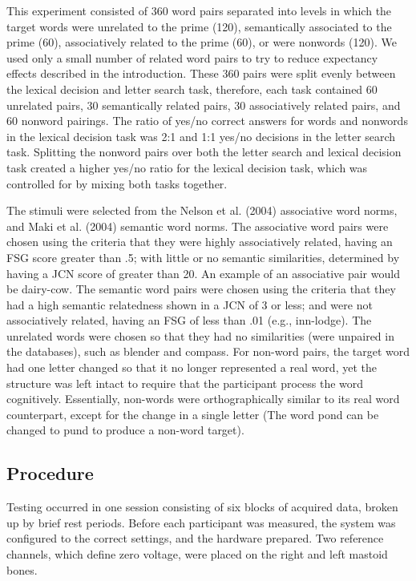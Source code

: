 \documentclass[english,man]{apa6}
\theoremstyle{definition}
\theoremstyle{definition}
\theoremstyle{remark}
\begin{document}
This experiment consisted of 360 word pairs separated into levels in
which the target words were unrelated to the prime (120), semantically
associated to the prime (60), associatively related to the prime (60),
or were nonwords (120). We used only a small number of related word
pairs to try to reduce expectancy effects described in the introduction.
These 360 pairs were split evenly between the lexical decision and
letter search task, therefore, each task contained 60 unrelated pairs,
30 semantically related pairs, 30 associatively related pairs, and 60
nonword pairings. The ratio of yes/no correct answers for words and
nonwords in the lexical decision task was 2:1 and 1:1 yes/no decisions
in the letter search task. Splitting the nonword pairs over both the
letter search and lexical decision task created a higher yes/no ratio
for the lexical decision task, which was controlled for by mixing both
tasks together.

The stimuli were selected from the Nelson et al. (2004) associative word
norms, and Maki et al. (2004) semantic word norms. The associative word
pairs were chosen using the criteria that they were highly associatively
related, having an FSG score greater than .5; with little or no semantic
similarities, determined by having a JCN score of greater than 20. An
example of an associative pair would be dairy-cow. The semantic word
pairs were chosen using the criteria that they had a high semantic
relatedness shown in a JCN of 3 or less; and were not associatively
related, having an FSG of less than .01 (e.g., inn-lodge). The unrelated
words were chosen so that they had no similarities (were unpaired in the
databases), such as blender and compass. For non-word pairs, the target
word had one letter changed so that it no longer represented a real
word, yet the structure was left intact to require that the participant
process the word cognitively. Essentially, non-words were
orthographically similar to its real word counterpart, except for the
change in a single letter (The word pond can be changed to pund to
produce a non-word target).

\subsection{Procedure}\label{procedure}

Testing occurred in one session consisting of six blocks of acquired
data, broken up by brief rest periods. Before each participant was
measured, the system was configured to the correct settings, and the
hardware prepared. Two reference channels, which define zero voltage,
were placed on the right and left mastoid bones.
\end{document}
